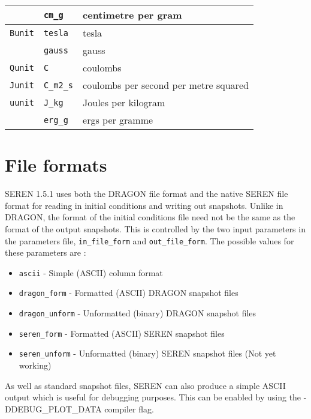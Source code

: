 \documentclass[a4paper]{article}
\newcommand{\NAME}{SEREN }
\newcommand{\VERNO}{1.5.1 }
\newcommand{\var}[1]{\texttt{#1}}
\begin{document}
\begin{center}
\begin{supertabular}{|p{3cm}|p{3cm}|p{6cm}|}
                & \var{cm\_g}     & centimetre per gram \\ 
\hline
\var{Bunit}     & \var{tesla}     & tesla \\
                & \var{gauss}     & gauss \\
\hline
\var{Qunit}     & \var{C}         & coulombs \\
\hline
\var{Junit}     & \var{C\_m2\_s}    & coulombs per second per metre squared \\
\hline
\var{uunit}     & \var{J\_kg}     & Joules per kilogram \\
                & \var{erg\_g}    & ergs per gramme \\
\end{supertabular}
\end{center}


\newpage


\section{File formats}
\NAME \VERNO uses both the DRAGON file format and the native \NAME file format for reading in initial conditions and writing out snapshots.  Unlike in DRAGON, the format of the initial conditions file need not be the same as the format of the output snapshots.  This is controlled by the two input parameters in the parameters file, \var{in\_file\_form} and \var{out\_file\_form}.  The possible values for these parameters are : 
\begin{itemize}
\item \var{ascii} - Simple (ASCII) column format
\item \var{dragon\_form} - Formatted (ASCII) DRAGON snapshot files
\item \var{dragon\_unform} - Unformatted (binary) DRAGON snapshot files
\item \var{seren\_form} - Formatted (ASCII) \NAME snapshot files
\item \var{seren\_unform} - Unformatted (binary) \NAME snapshot files (Not yet working)
\end{itemize}

As well as standard snapshot files, \NAME can also produce a simple ASCII output which is useful for debugging purposes.  This can be enabled by using the {\rm -DDEBUG\_PLOT\_DATA} compiler flag.


\end{document}
